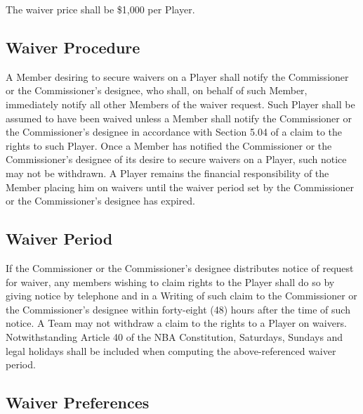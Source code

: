 \documentclass[]{book}
\theoremstyle{definition}
\theoremstyle{definition}
\theoremstyle{definition}
\theoremstyle{remark}
\begin{document}
The waiver price shall be \$1,000 per Player.

\subsection{Waiver Procedure}\label{waiver-procedure}

A Member desiring to secure waivers on a Player shall notify the
Commissioner or the Commissioner's designee, who shall, on behalf of
such Member, immediately notify all other Members of the waiver request.
Such Player shall be assumed to have been waived unless a Member shall
notify the Commissioner or the Commissioner's designee in accordance
with Section 5.04 of a claim to the rights to such Player. Once a Member
has notified the Commissioner or the Commissioner's designee of its
desire to secure waivers on a Player, such notice may not be withdrawn.
A Player remains the financial responsibility of the Member placing him
on waivers until the waiver period set by the Commissioner or the
Commissioner's designee has expired.

\subsection{Waiver Period}\label{waiver-period}

If the Commissioner or the Commissioner's designee distributes notice of
request for waiver, any members wishing to claim rights to the Player
shall do so by giving notice by telephone and in a Writing of such claim
to the Commissioner or the Commissioner's designee within forty-eight
(48) hours after the time of such notice. A Team may not withdraw a
claim to the rights to a Player on waivers. Notwithstanding Article 40
of the NBA Constitution, Saturdays, Sundays and legal holidays shall be
included when computing the above-referenced waiver period.

\subsection{Waiver Preferences}\label{waiver-preferences}
\end{document}
